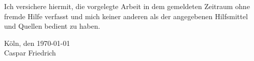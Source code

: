 
\noindent Ich versichere hiermit, die vorgelegte Arbeit in dem gemeldeten Zeitraum ohne fremde Hilfe verfasst und mich keiner anderen als der angegebenen Hilfsmittel und Quellen bedient zu haben.

\vfill

\noindent Köln, den \today \\[1cm]

\noindent Caspar Friedrich